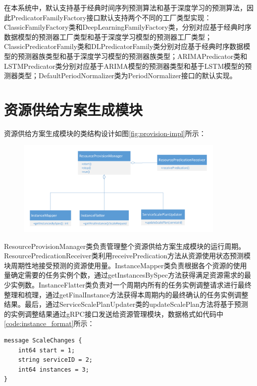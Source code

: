 在本系统中，默认支持基于经典时间序列预测算法和基于深度学习的预测算法，因此PredicatorFamilyFactory接口默认支持两个不同的工厂类型实现：ClassicFamilyFactory类和DeepLearningFamilyFactory类，分别对应基于经典时序数据模型的预测器工厂类型和基于深度学习模型的预测器工厂类型；ClassicPredicatorFamily类和DLPredicatorFamily类分别对应基于经典时序数据模型的预测器族类型和基于深度学习模型的预测器族类型；ARIMAPredicator类和LSTMPredicator类分别对应基于ARIMA模型的预测器类型和基于LSTM模型的预测器类型；DefaultPeriodNormalizer类为PeriodNormalizer接口的默认实现。

\section{资源供给方案生成模块}
资源供给方案生成模块的类结构设计如图\ref{fig:provision-impl}所示：
\begin{figure}[H]
\centering
\includegraphics[width=0.9\textwidth]{./figure/provision_impl}
\end{figure}

ResourceProvisionManager类负责管理整个资源供给方案生成模块的运行周期。ResourcePredicationReceiver类利用receivePredication方法从资源使用状态预测模块周期性地接受预测的资源使用量。InstanceMapper类负责根据各个资源的使用量确定需要的任务实例个数，通过getInstancesBySpec方法获得满足资源需求的最少实例数。InstanceFlatter类负责对一个周期内所有的任务实例调整请求进行最终整理和梳理，通过getFinalInstance方法获得本周期内的最终确认的任务实例调整结果。最后，通过ServiceScalePlanUpdater类的updateScalePlan方法将基于预测的实例调整结果通过gRPC接口发送给资源管理模块，数据格式如代码中\ref{code:instance_format}所示：
\begin{lstlisting}[language=protobuf3,style=protobuf, caption={资源使用状态监测数据},label={code:instance_format}]
message ScaleChanges {
    int64 start = 1;
    string serviceID = 2;
    int64 instances = 3;
}
\end{lstlisting}

